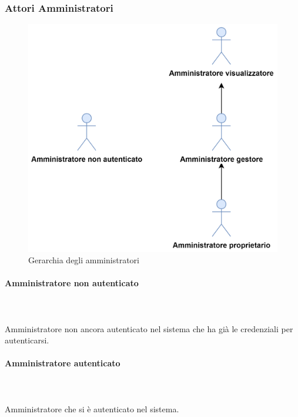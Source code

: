 \subsubsection{Attori Amministratori}
\begin{figure}[h]
  \centering
    \includegraphics[scale=0.8]{Sezioni/UseCase/Immagini/Amministratori.png}
    \caption{Gerarchia degli amministratori}
\end{figure}


\paragraph{Amministratore non autenticato}\mbox{}\\ \\
Amministratore non ancora autenticato nel sistema che ha già le credenziali per autenticarsi.
\paragraph{Amministratore autenticato}\mbox{}\\ \\
Amministratore che si è autenticato nel sistema.
